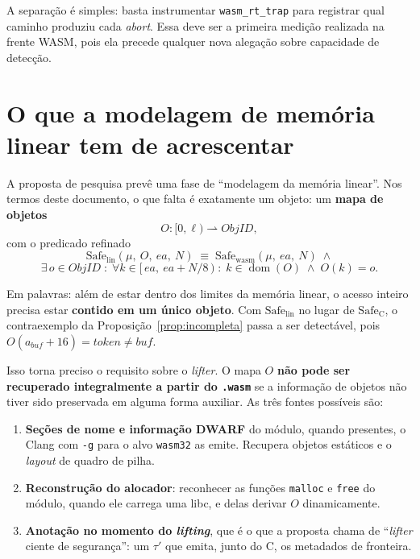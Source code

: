 \documentclass[11pt,a4paper]{article}
\theoremstyle{definition}
\newcommand{\Safe}{\mathrm{Safe}}
\newcommand{\wasm}{\mathrm{wasm}}
\newcommand{\lin}{\mathrm{lin}}
\newcommand{\code}[1]{\texttt{#1}}
\begin{document}
A separação é simples: basta
instrumentar \code{wasm\_rt\_trap} para registrar qual caminho produziu cada
\emph{abort}. Essa deve ser a primeira medição realizada na frente WASM, pois
ela precede qualquer nova alegação sobre capacidade de detecção.

\section{O que a modelagem de memória linear tem de acrescentar}
\label{sec:mapaO}

A proposta de pesquisa prevê uma fase de ``modelagem da memória linear''. Nos
termos deste documento, o que falta é exatamente um objeto: um \textbf{mapa de
objetos}
\[
  O : [0,\ell) \rightharpoonup \mathit{ObjID},
\]
com o predicado refinado
\[
  \Safe_{\lin}(\mu,\ O,\ ea,\ N) \;\equiv\;
  \Safe_{\wasm}(\mu,\ ea,\ N) \;\wedge
\]
\[
  \exists\, o \in \mathit{ObjID} \;:\;
  \forall k \in [\,ea,\ ea + N/8\,) \;:\;
  k \in \operatorname{dom}(O) \;\wedge\; O(k) = o .
\]

Em
palavras: além de estar dentro dos limites da memória linear, o acesso inteiro
precisa estar \textbf{contido em um único objeto}. Com $\Safe_{\lin}$ no lugar
de $\Safe_{\mathrm{C}}$, o contraexemplo da Proposição~\ref{prop:incompleta}
passa a ser detectável, pois
$O(a_{\mathit{buf}} + 16) = \mathit{token} \ne \mathit{buf}$.

Isso torna preciso o requisito sobre o \emph{lifter}. O mapa $O$
\textbf{não pode ser recuperado integralmente a partir do \code{.wasm}} se a
informação de objetos não tiver sido preservada em alguma forma auxiliar. As
três fontes possíveis são:

\begin{enumerate}[leftmargin=1.6em]
  \item \textbf{Seções de nome e informação DWARF} do módulo, quando presentes,
        o Clang com \code{-g} para o alvo \code{wasm32} as emite. Recupera objetos
        estáticos e o \emph{layout} de quadro de pilha.
  \item \textbf{Reconstrução do alocador}: reconhecer as funções \code{malloc} e
        \code{free} do módulo, quando ele carrega uma libc, e delas derivar $O$
        dinamicamente.
  \item \textbf{Anotação no momento do \emph{lifting}}, que é o que a proposta
        chama de ``\emph{lifter} ciente de segurança'': um $\tau'$ que emita,
        junto do C, os metadados de fronteira.
\end{enumerate}
\end{document}
